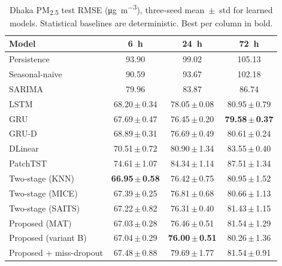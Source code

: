 \documentclass[review,3p,times]{elsarticle}
\newcommand{\ugm}{\si{\micro\gram\per\cubic\metre}}
\newcommand{\pmf}{PM\textsubscript{2.5}}
\begin{document}
\begin{table}[t]
\centering
\caption{Dhaka \pmf{} test RMSE (\ugm), three-seed mean~$\pm$~std for learned
models. Statistical baselines are deterministic. Best per column in bold.}
\label{tab:main}
\small
\begin{tabular}{lccc}
\toprule
Model & \SI{6}{\hour} & \SI{24}{\hour} & \SI{72}{\hour} \\
\midrule
Persistence            & 93.90 & 99.02 & 105.13 \\
Seasonal-naive         & 90.59 & 93.67 & 102.18 \\
SARIMA                 & 79.96 & 83.87 & 86.74 \\
LSTM                   & 68.20\,$\pm$\,0.34 & 78.05\,$\pm$\,0.08 & 80.95\,$\pm$\,0.79 \\
GRU                    & 67.69\,$\pm$\,0.47 & 76.45\,$\pm$\,0.20 & \textbf{79.58\,$\pm$\,0.37} \\
GRU-D                  & 68.89\,$\pm$\,0.31 & 76.69\,$\pm$\,0.49 & 80.61\,$\pm$\,0.24 \\
DLinear                & 70.51\,$\pm$\,0.72 & 80.90\,$\pm$\,1.34 & 83.55\,$\pm$\,0.40 \\
PatchTST               & 74.61\,$\pm$\,1.07 & 84.34\,$\pm$\,1.14 & 87.51\,$\pm$\,1.34 \\
Two-stage (KNN)        & \textbf{66.95\,$\pm$\,0.58} & 76.42\,$\pm$\,0.75 & 80.95\,$\pm$\,1.52 \\
Two-stage (MICE)       & 67.39\,$\pm$\,0.25 & 76.81\,$\pm$\,0.68 & 80.66\,$\pm$\,1.13 \\
Two-stage (SAITS)      & 67.22\,$\pm$\,0.82 & 76.31\,$\pm$\,0.40 & 81.43\,$\pm$\,1.15 \\
Proposed (MAT)         & 67.03\,$\pm$\,0.28 & 76.46\,$\pm$\,0.51 & 81.54\,$\pm$\,1.29 \\
Proposed (variant B)   & 67.04\,$\pm$\,0.29 & \textbf{76.00\,$\pm$\,0.51} & 80.26\,$\pm$\,1.36 \\
Proposed + miss-dropout& 67.48\,$\pm$\,0.88 & 79.69\,$\pm$\,1.77 & 81.54\,$\pm$\,0.91 \\
\bottomrule
\end{tabular}
\end{table}
\end{document}
